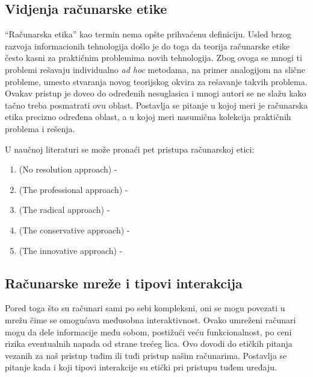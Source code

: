 \documentclass[a4paper]{article}
\begin{document}
\subsection{Vidjenja računarske etike}
``Računarska etika'' kao termin nema opšte prihvaćenu definiciju. Usled brzog razvoja informacionih tehnologija došlo je do toga da teorija računarske etike često kasni za praktičnim problemima novih tehnologija. Zbog ovoga se mnogi ti problemi rešavaju individualno \textit{ad hoc} metodama, na primer analogijom na slične probleme, umesto stvaranja novog teorijskog okvira za rešavanje takvih problema. Ovakav pristup je doveo do određenih nesuglasica i mnogi autori se ne slažu kako tačno treba posmatrati ovu oblast. Postavlja se pitanje u kojoj meri je računarska etika precizno određena oblast, a u kojoj meri nasumična kolekcija praktičnih problema i rešenja.

U naučnoj literaturi se može pronaći pet pristupa računarskoj etici\cite{floridi}:

\begin{enumerate}
	\item \textbf{} (No resolution approach) -
	\item \textbf{} (The professional approach) -
	\item \textbf{} (The radical approach) -
	\item \textbf{} (The conservative approach) -
	\item \textbf{} (The innovative approach) -
\end{enumerate}





\subsection{Računarske mreže i tipovi interakcija}
Pored toga što su računari sami po sebi kompleksni, oni se mogu povezati u mrežu čime se omogućava međusobna interaktivnost. Ovako umreženi računari mogu da dele informacije među sobom, postižući veću funkcionalnost, po ceni rizika eventualnih napada od strane trećeg lica. Ovo dovodi do etičkih pitanja vezanih za naš pristup tuđim ili tuđi pristup našim računarima. Postavlja se pitanje kada i koji tipovi interakcije su etički pri pristupu tuđem uređaju.
\end{document}
